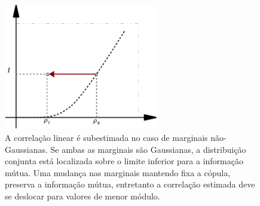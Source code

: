 \begin{figure}
 \centering
 \includegraphics[width = 0.6\textwidth]{./figuras/fig1-mod.pdf} 
 \caption[ A correlação linear é subestimada no caso de marginais não-Gaussianas.]{A correlação linear é subestimada no caso de marginais não-Gaussianas. Se ambas as marginais são Gaussianas, a distribuição conjunta está localizada sobre o limite inferior para a informação mútua. Uma mudança nas marginais mantendo fixa a cópula, preserva a informação mútua, entretanto a correlação estimada deve se deslocar para valores de menor módulo.}
 \label{fig:correlinfomutua}
\end{figure}

